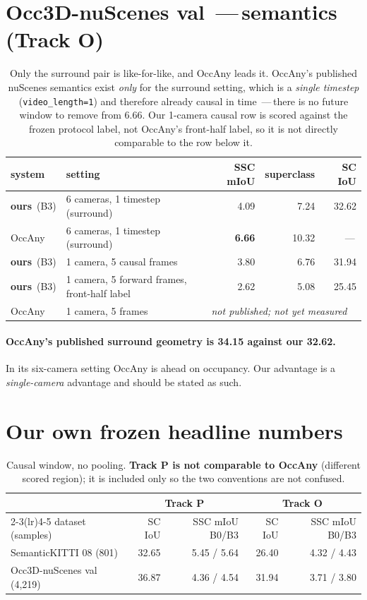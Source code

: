 \documentclass[11pt,a4paper]{article}
\newcommand{\us}{\textbf{ours}}
\newcommand{\nm}{\,---\,}
\begin{document}
\section{Occ3D-nuScenes val \nm semantics (Track O)}

\begin{table}[h]\centering
\begin{tabular}{llrrr}
\toprule
system & setting & SSC mIoU & superclass & SC IoU \\
\midrule
\us\ (B3) & 6 cameras, 1 timestep (surround) & 4.09 & 7.24 & 32.62 \\
OccAny    & 6 cameras, 1 timestep (surround) & \textbf{6.66} & 10.32 & \nm \\
\midrule
\us\ (B3) & 1 camera, 5 causal frames & 3.80 & 6.76 & 31.94 \\
\us\ (B3) & 1 camera, 5 forward frames, front-half label & 2.62 & 5.08 & 25.45 \\
OccAny    & 1 camera, 5 frames & \multicolumn{3}{l}{\emph{not published; not yet measured}} \\
\bottomrule
\end{tabular}
\caption{Only the surround pair is like-for-like, and OccAny leads it. OccAny's published nuScenes
semantics exist \emph{only} for the surround setting, which is a \emph{single timestep}
(\texttt{video\_length=1}) and therefore already causal in time \nm there is no future window to remove
from $6.66$. Our 1-camera causal row is scored against the frozen protocol label, not OccAny's
front-half label, so it is not directly comparable to the row below it.}
\end{table}

\paragraph{OccAny's published surround geometry is 34.15 against our 32.62.} In its six-camera setting
OccAny is ahead on occupancy. Our advantage is a \emph{single-camera} advantage and should be stated as
such.

\section{Our own frozen headline numbers}\label{sec:ours}

\begin{table}[h]\centering
\begin{tabular}{lrrrr}
\toprule
 & \multicolumn{2}{c}{Track P} & \multicolumn{2}{c}{Track O} \\
\cmidrule(lr){2-3}\cmidrule(lr){4-5}
dataset (samples) & SC IoU & SSC mIoU B0/B3 & SC IoU & SSC mIoU B0/B3 \\
\midrule
SemanticKITTI 08 (801)        & 32.65 & 5.45 / 5.64 & 26.40 & 4.32 / 4.43 \\
Occ3D-nuScenes val (4{,}219)  & 36.87 & 4.36 / 4.54 & 31.94 & 3.71 / 3.80 \\
\bottomrule
\end{tabular}
\caption{Causal window, no pooling. \textbf{Track P is not comparable to OccAny} (different scored
region); it is included only so the two conventions are not confused.}
\end{table}
\end{document}
